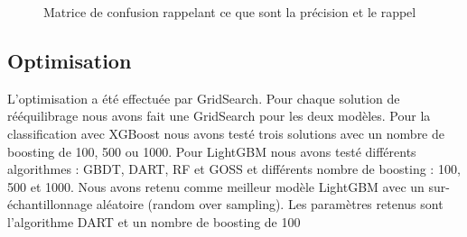 \documentclass[12pt, a4paper]{article}
\begin{document}
\begin{figure}[h]
    \begin{center}
    \end{center}
    \caption{Matrice de confusion rappelant ce que sont la précision et le rappel}
    \label{fig:ConfMatrix}
\end{figure}

\subsection{Optimisation}

L'optimisation a été effectuée par GridSearch. Pour chaque solution de rééquilibrage nous avons fait une GridSearch pour les deux modèles. Pour la classification avec XGBoost nous avons testé trois solutions avec un nombre de boosting de 100, 500 ou 1000.
Pour LightGBM nous avons testé différents algorithmes : GBDT, DART, RF et GOSS et différents nombre de boosting : 100, 500 et 1000.
Nous avons retenu comme meilleur modèle LightGBM avec un sur-échantillonnage aléatoire (random over sampling). Les paramètres retenus sont l'algorithme DART et un nombre de boosting de 100
\end{document}
